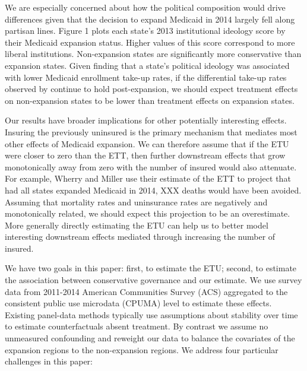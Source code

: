 \documentclass[12pt]{article}
\begin{document}
We are especially concerned about how the political composition would drive differences given that the decision to expand Medicaid in 2014 largely fell along partisan lines. Figure 1 plots each state's 2013 institutional ideology score by their Medicaid expansion status. Higher values of this score correspond to more liberal institutions. Non-expansion states are significantly more conservative than expansion states. Given \cite{sommers2012understanding} finding that a state's political ideology was associated with lower Medicaid enrollment take-up rates, if the differential take-up rates observed by \cite{sommers2012understanding} continue to hold post-expansion, we should expect treatment effects on non-expansion states to be lower than treatment effects on expansion states. 


Our results have broader implications for other potentially interesting effects. Insuring the previously uninsured is the primary mechanism that mediates most other effects of Medicaid expansion. We can therefore assume that if the ETU were closer to zero than the ETT, then further downstream effects that grow monotonically away from zero with the number of insured would also attenuate. For example, Wherry and Miller use their estimate of the ETT to project that had all states expanded Medicaid in 2014, XXX deaths would have been avoided. Assuming that mortality rates and uninsurance rates are negatively and monotonically related, we should expect this projection to be an overestimate. More generally directly estimating the ETU can help us to better model interesting downstream effects mediated through increasing the number of insured.

We have two goals in this paper: first, to estimate the ETU; second, to estimate the association between conservative governance and our estimate. We use survey data from 2011-2014 American Communities Survey (ACS) aggregated to the consistent public use microdata (CPUMA) level to estimate these effects. Existing panel-data methods typically use assumptions about stability over time to estimate counterfactuals absent treatment. By contrast we assume no unmeasured confounding and reweight our data to balance the covariates of the expansion regions to the non-expansion regions. We address four particular challenges in this paper: 
\end{document}
